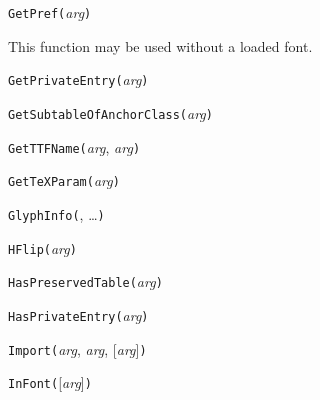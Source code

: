 
\texttt{GetPref(}\textit{arg}\texttt{)}

This function may be used without a loaded font.



\texttt{GetPrivateEntry(}\textit{arg}\texttt{)}



\texttt{GetSubtableOfAnchorClass(}\textit{arg}\texttt{)}



\texttt{GetTTFName(}\textit{arg}, \textit{arg}\texttt{)}



\texttt{GetTeXParam(}\textit{arg}\texttt{)}



\texttt{GlyphInfo(}, \ldots\texttt{)}



\texttt{HFlip(}\textit{arg}\texttt{)}



\texttt{HasPreservedTable(}\textit{arg}\texttt{)}



\texttt{HasPrivateEntry(}\textit{arg}\texttt{)}



\texttt{Import(}\textit{arg}, \textit{arg}, [\textit{arg}]\texttt{)}



\texttt{InFont(}[\textit{arg}]\texttt{)}


